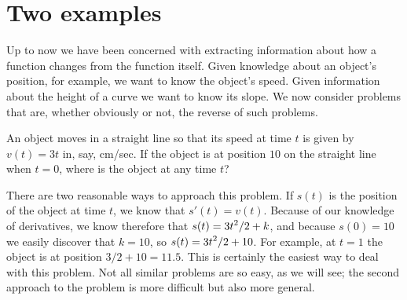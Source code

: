 \section{Two examples}{}{}
\nobreak
Up to now we have been concerned with extracting information about how
a function changes from the function itself. Given knowledge about an
object's position, for example, we want to know the object's
speed. Given information about the height of a curve we want to know
its slope. We now consider problems that are, whether obviously or
not, the reverse of such problems.

\example
An object moves in a straight line so that
its speed at time $t$ is given by $v(t)=3t$ in, say, cm/sec. If the
object is at position $10$ on the straight line when $t=0$, where is
the object at any time $t$? 

There are two reasonable ways to approach this problem. If $s(t)$ is
the position of the object at time $t$, we know that
$s'(t)=v(t)$. Because of our knowledge of derivatives, we know
therefore that $\displaystyle s(t)=3t^2/2+k$, and because $s(0)=10$ we easily
discover that $k=10$, so $\displaystyle s(t)=3t^2/2+10$. For example, at $t=1$ the
object is at position $3/2+10=11.5$.
This is certainly the easiest way to deal with this problem. Not all
similar problems are so easy, as we will see; the second approach to
the problem is more difficult but also more general.

